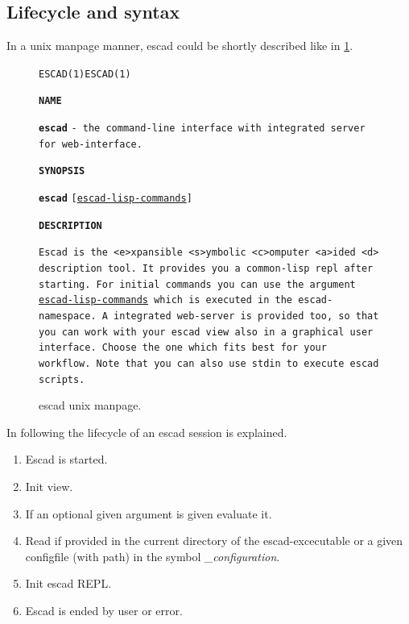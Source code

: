 \documentclass[a4paper, 12pt, openany]{scrbook}
\begin{document}
\subsection{Lifecycle and syntax}
In a unix manpage manner, escad could be shortly described like in \ref{fig:manpage}.
\begin{figure}[htbp]
  \begin{shaded*}
    \texttt{ESCAD(1)}\hspace{110mm}\texttt{ESCAD(1)}\newline
    
    \textbf{\texttt{NAME}}\newline
    \hspace*{5mm}
    \begin{minipage}{14cm}
      \textbf{\texttt{escad}} \texttt{- the command-line interface with integrated server for web-interface.}
    \end{minipage}\newline\newline
    
    \textbf{\texttt{SYNOPSIS}}\newline
    \hspace*{5mm}
    \begin{minipage}{14cm}
      \textbf{\texttt{escad}} \texttt{[\underline{escad-lisp-commands}]}
    \end{minipage}\newline\newline
      
    \textbf{\texttt{DESCRIPTION}}\newline
    \hspace*{5mm}
    \begin{minipage}{14cm}
      \texttt{Escad is the <e>xpansible <s>ymbolic <c>omputer <a>ided <d> description tool. It provides you a common-lisp repl after starting. For initial commands you can use the argument \underline{escad-lisp-commands} which is executed in the escad-namespace. A integrated web-server is provided too, so that you can work with your escad view also in a graphical user interface. Choose the one which fits best for your workflow. Note that you can also use stdin to execute escad scripts.}
    \end{minipage}
    \end{shaded*}
  \caption{escad unix manpage.}
  \label{fig:manpage}
\end{figure}
In following the lifecycle of an escad session is explained.
\begin{enumerate}
\item Escad is started.
\item Init view.
\item If an optional given argument is given evaluate it.
\item Read  if provided in the current directory of the escad-excecutable or a given configfile (with path) in the symbol \emph{\_configuration}.
\item Init escad REPL.
\item Escad is ended by user or error.
\end{enumerate}
\end{document}
